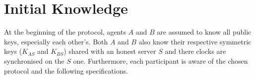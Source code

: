 \section{Initial Knowledge}
At the beginning of the protocol, agents $A$ and $B$ are assumed to know all public keys, especially each other’s.
Both $A$ and $B$ also know their respective symmetric keys ($K_{AS}$ and $K_{BS}$) shared with an honest server $S$
and there clocks are synchronised on the $S$ one. Furthermore, each participant is aware of the chosen protocol
and the following specifications.